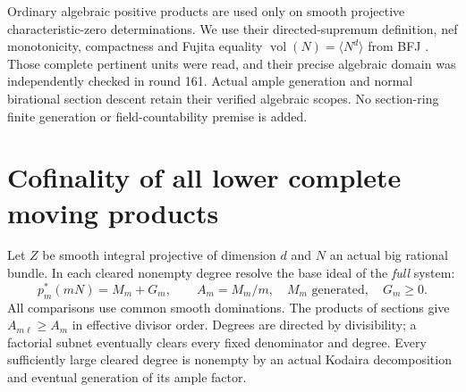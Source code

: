 \documentclass[11pt]{article}
\newcommand{\vol}{\operatorname{vol}}
\begin{document}
Ordinary algebraic positive products are used only on smooth
projective characteristic-zero determinations. We use their
directed-supremum definition, nef monotonicity, compactness and
Fujita equality $\vol(N)=\langle N^d\rangle$ from BFJ
\cite[Sections 2--3]{BFJ}. Those complete pertinent units were
read, and their precise algebraic domain was independently checked
in round 161. Actual ample generation and normal birational section
descent retain their verified algebraic scopes. No section-ring
finite generation or field-countability premise is added.

\section{Cofinality of all lower complete moving products}\label{cofinal}
Let $Z$ be smooth integral projective of dimension $d$ and $N$ an
actual big rational bundle. In each cleared nonempty degree resolve
the base ideal of the \emph{full} system:
\[
 p_m^*(mN)=M_m+G_m,\qquad A_m=M_m/m,
 \quad M_m\text{ generated},\quad G_m\geq0.             \tag{2}
\]
All comparisons use common smooth dominations.
The products of sections give $A_{m\ell}\geq A_m$ in effective
divisor order. Degrees are directed by divisibility; a factorial
subnet eventually clears every fixed denominator and degree.
Every sufficiently large cleared degree is nonempty by an actual
Kodaira decomposition and eventual generation of its ample factor.
\end{document}
